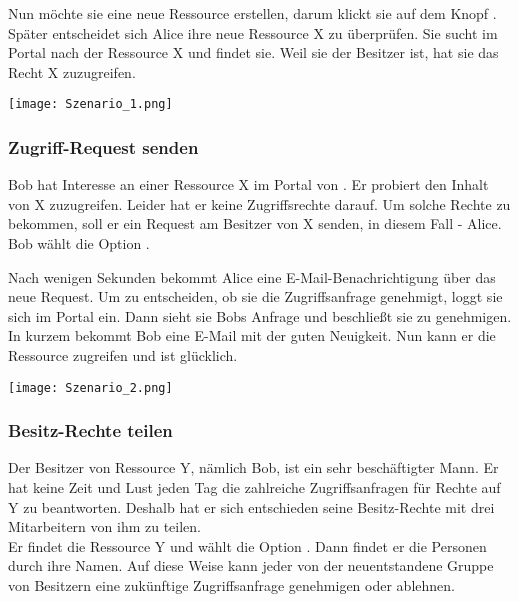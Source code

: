 \documentclass[parskip=full,11pt]{scrartcl}
\begin{document}
Nun möchte sie eine neue Ressource erstellen, darum klickt sie auf dem Knopf \grqq. Später entscheidet sich Alice ihre neue Ressource X zu überprüfen. Sie sucht im Portal nach der Ressource X und findet sie. Weil sie der Besitzer ist, hat sie das Recht X zuzugreifen.\\

	\begin{center}
	\texttt{[image: Szenario\_1.png]}
	\end{center}

\subsubsection*{Zugriff-Request senden}
Bob hat Interesse an einer Ressource X im Portal von \grqq. Er probiert den Inhalt von X zuzugreifen. Leider hat er keine Zugriffsrechte darauf. Um solche Rechte zu bekommen, soll er ein Request am Besitzer von X senden, in diesem Fall - Alice. Bob wählt die Option \grqq. 

Nach wenigen Sekunden bekommt Alice eine E-Mail-Benachrichtigung über das neue Request. Um zu entscheiden, ob sie die Zugriffsanfrage genehmigt, loggt sie sich im Portal ein. Dann sieht sie Bobs Anfrage und beschließt sie zu genehmigen. In kurzem bekommt Bob eine E-Mail mit der guten Neuigkeit. Nun kann er die Ressource zugreifen und ist glücklich.\\
	
	\begin{center}
	\texttt{[image: Szenario\_2.png]}
	\end{center}

\newpage
\subsubsection*{Besitz-Rechte teilen}
Der Besitzer von Ressource Y, nämlich Bob, ist ein sehr beschäftigter Mann. Er hat keine Zeit und Lust jeden Tag die zahlreiche Zugriffsanfragen für Rechte auf Y zu beantworten. Deshalb hat er sich entschieden seine Besitz-Rechte mit drei Mitarbeitern von ihm zu teilen. \\
Er findet die Ressource Y und wählt die Option \grqq. Dann findet er die Personen durch ihre Namen. Auf diese Weise kann jeder von der neuentstandene Gruppe von Besitzern eine zukünftige Zugriffsanfrage genehmigen oder ablehnen.\\
\end{document}
